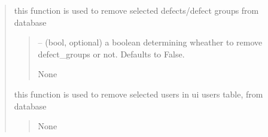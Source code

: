 \documentclass[letterpaper,10pt,english]{sphinxmanual}
\begin{document}
\begin{quote}
\begin{savenotes}
\begin{fulllineitems}
\begin{savenotes}
\begin{fulllineitems}
\begin{quote}
\begin{description}
\end{description}\end{quote}

\end{fulllineitems}\end{savenotes}


\begin{savenotes}\begin{fulllineitems}
\label{\detokenize{setting/setting_api:oxin.setting_api.API.remove_defects}}
\pysigstartsignatures
{}
\pysigstopsignatures
\sphinxAtStartPar
this function is used to remove selected defects/defect groups from database
\begin{quote}\begin{description}
\sphinxAtStartPar
{} – (bool, optional) a boolean determining wheather to remove defect\_groups or not. Defaults to False.

\sphinxAtStartPar
None

\end{description}\end{quote}

\end{fulllineitems}\end{savenotes}


\begin{savenotes}\begin{fulllineitems}
\label{\detokenize{setting/setting_api:oxin.setting_api.API.remove_users}}
\pysigstartsignatures
{}
\pysigstopsignatures
\sphinxAtStartPar
this function is used to remove selected users in ui users table, from database
\begin{quote}\begin{description}
\sphinxAtStartPar
None

\end{description}\end{quote}


\end{fulllineitems}
\end{savenotes}
\end{fulllineitems}
\end{savenotes}
\end{quote}
\end{document}
